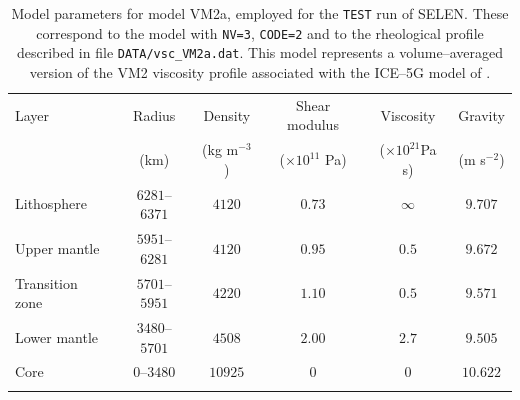 \documentclass[11pt,fleqn,a4paper,titlepage]{article}
\newcommand\selens{\textsf{SELEN}}
\begin{document}
%
%
\begin{table}[p]
\begin{center}
\caption[Model parameters (\texttt{TEST} run)]{Model parameters for model VM2a, employed for the \texttt{TEST} run of \selens. These correspond to the model with \texttt{NV=3}, \texttt{CODE=2} and to the rheological profile described in file \texttt{DATA/vsc\_VM2a.dat}. This model represents a volume--averaged version of the VM2 viscosity profile associated with the ICE--5G model of \citet{Peltier_2004}.}
\begin{tabular}{lccccc}
\hline
Layer                           & Radius                        &Density                        &Shear modulus          &Viscosity                              &       Gravity\\
                                       & (km)                  &(kg m$^{-3}$)          &($\times 10^{11}$ Pa)  &($\times 10^{21}$Pa s) &(m s$^{-2}$)\\
\hline
{Lithosphere}                     & $6281$--$6371$        &$4120$                 &$0.73$                 &$\infty$                               &$9.707$\\
{Upper mantle}    & $5951$--$6281$        &$4120$                 &$0.95$                 &$0.5$                          &$9.672$\\
{Transition zone}                 & $5701$--$5951$        &$4220$                 &$1.10$                 &$0.5$                          &$9.571$\\
{Lower mantle}                    & $3480$--$5701$        &$4508$                 &$2.00$                 &$2.7$                          &$9.505$\\
{Core}                           & $0$--$3480$   & $10925$               &$0$                         &$0$                            &$10.622$\\
\hline
\label{table:vm2a}
\end{tabular}
\end{center}
\end{table}
\newpage
\end{document}

